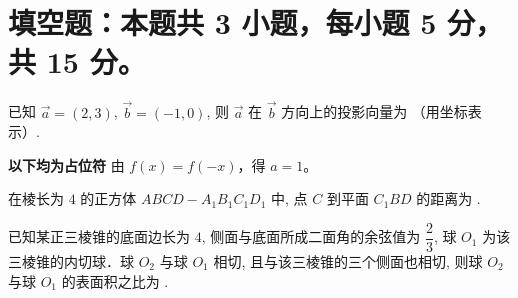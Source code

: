 \section{填空题：本题共 3 小题，每小题 5 分，共 15 分。}

\begin{question}
  已知 $\vec{a}=(2,3)$, $\vec{b}=(-1,0)$, 则 $\vec{a}$ 在 $\vec{b}$ 方向上的投影向量为 \fillin[$(2, 0)$]（用坐标表示）.
  \begin{solution}
    \textbf{以下均为占位符}
    由 $f(x) = f(-x)$，得 $a = 1$。
  \end{solution}
\end{question}

\begin{question}
  在棱长为 $4$ 的正方体 $ABCD-A_1B_1C_1D_1$ 中, 点 $C$ 到平面 $C_1BD$ 的距离为 .
\end{question}

\begin{question}
  已知某正三棱锥的底面边长为 $4$, 侧面与底面所成二面角的余弦值为 $\dfrac{2}{3}$, 球 $O_1$ 为该三棱锥的内切球．球 $O_2$ 与球 $O_1$ 相切, 且与该三棱锥的三个侧面也相切, 则球 $O_2$ 与球 $O_1$ 的表面积之比为 \fillin[$\frac{1}{25}$].
\end{question}